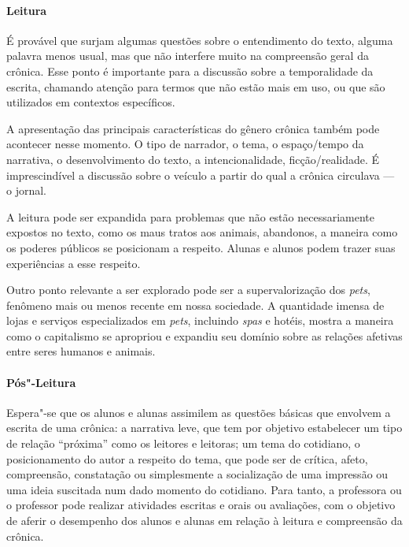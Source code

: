 \documentclass{extarticle}
\begin{document}
\paragraph{Leitura}

É provável que surjam algumas questões sobre o entendimento do texto,
alguma palavra menos usual, mas que não interfere muito na compreensão
geral da crônica. Esse ponto é importante para a discussão sobre a
temporalidade da escrita, chamando atenção para termos que não estão
mais em uso, ou que são utilizados em contextos específicos.

A apresentação das principais características do gênero crônica também
pode acontecer nesse momento. O tipo de narrador, o tema, o espaço/tempo
da narrativa, o desenvolvimento do texto, a intencionalidade,
ficção/realidade. É imprescindível a discussão sobre o veículo a partir
do qual a crônica circulava --- o jornal.

A leitura pode ser expandida para problemas que não estão
necessariamente expostos no texto, como os maus tratos aos animais,
abandonos, a maneira como os poderes públicos se posicionam a respeito.
Alunas e alunos podem trazer suas experiências a esse respeito.

Outro ponto relevante a ser explorado pode ser a supervalorização dos
\emph{pets}, fenômeno mais ou menos recente em nossa sociedade. A
quantidade imensa de lojas e serviços especializados em \emph{pets},
incluindo \emph{spas} e hotéis, mostra a maneira como o capitalismo se
apropriou e expandiu seu domínio sobre as relações afetivas entre seres
humanos e animais.

{\paragraph{Pós"-Leitura}}

Espera"-se que os alunos e alunas assimilem as questões básicas que
envolvem a escrita de uma crônica: a narrativa leve, que tem por
objetivo estabelecer um tipo de relação ``próxima'' como os leitores e
leitoras; um tema do cotidiano, o posicionamento do autor a respeito do
tema, que pode ser de crítica, afeto, compreensão, constatação ou
simplesmente a socialização de uma impressão ou uma ideia suscitada num
dado momento do cotidiano. Para tanto, a professora ou o professor pode
realizar atividades escritas e orais ou avaliações, com o objetivo de
aferir o desempenho dos alunos e alunas em relação à leitura e
compreensão da crônica. 
\end{document}
